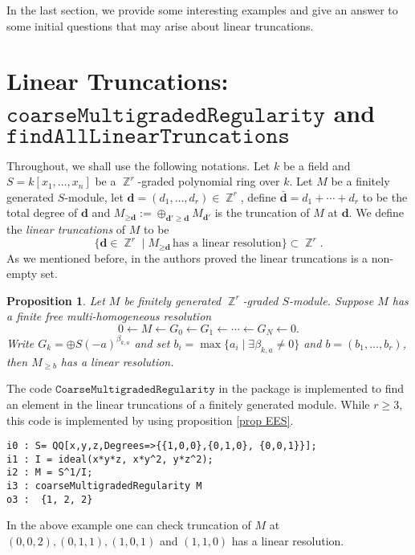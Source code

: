 \documentclass[11pt]{amsart}
\DeclareMathOperator{\Z}{\mathbb{Z}}
\newtheorem{prop}[thm]{Proposition}
\theoremstyle{definition}
\begin{document}
In the last section, we provide some interesting examples and give an answer to some initial questions  that may arise about linear truncations. 

\section{Linear Truncations: \\ $\mathtt{coarseMultigradedRegularity}$ and  $\mathtt{findAllLinearTruncations}$ }\label{Section Theorems}
Throughout, we shall use the following notations. Let $k$ be a field and $S=k[x_1,\dots ,x_n]$ be a $\Z^r$-graded polynomial ring over $k$. Let $M$ be a finitely generated $S$-module, let $\textbf{d}=(d_1,\dots,d_r)\in \Z^r$, define $\bar{\textbf{d}}=d_1+\cdots +d_r$ to be the total degree of $\textbf{d}$ and  $M_{\geq \textbf{d}}:= \oplus _{\textbf{d}'\geq \textbf{d}} M_{\textbf{d}'}$ is the truncation of $M$ at $\textbf{d}$. 
 We define the \textit{linear truncations} of $M$ to  be 
 $$
 \{ \textbf{d} \in \Z^r \mid M_{\geq \textbf{d}} \,\text{has a linear resolution}\}\subset \Z^r.
 $$
As we mentioned before, in \cite{EisenbudErmanSchreyer} the authors proved the linear truncations is a non-empty set.
 \begin{prop}\cite[Proposition 1.7 ]{EisenbudErmanSchreyer}\label{prop EES}
 Let $M$ be finitely generated $\Z^r$-graded $S$-module. Suppose $M$ has a finite free multi-homogeneous resolution
 $$
 0\leftarrow M\leftarrow G_0\leftarrow G_1\leftarrow \cdots \leftarrow G_N\leftarrow 0.
 $$
 Write $G_k= \oplus S(-a)^{\beta_{k,a}}$ and set $b_i = \max \{ a_i \mid \exists \beta_{k,a}\neq 0 \}$ and $b=(b_1,\dots,b_r)$, then $M_{\geq b}$ has a linear resolution.
 \end{prop}
The code $\mathtt{CoarseMultigradedRegularity}$ in the package is implemented to find an element in the linear truncations of a finitely generated module. While $r\geq 3$, this code is implemented by using  proposition \autoref{prop EES}.

  \begin{footnotesize}
 \begin{verbatim}
i0 : S= QQ[x,y,z,Degrees=>{{1,0,0},{0,1,0}, {0,0,1}}];
i1 : I = ideal(x*y*z, x*y^2, y*z^2);
i2 : M = S^1/I;
i3 : coarseMultigradedRegularity M
o3 :  {1, 2, 2}
\end{verbatim}
\end{footnotesize}
In  the above example one can check truncation of $M$ at $(0,0,2), (0,1,1), (1,0,1) $ and $(1,1,0)$ has a linear resolution. 
\end{document}
